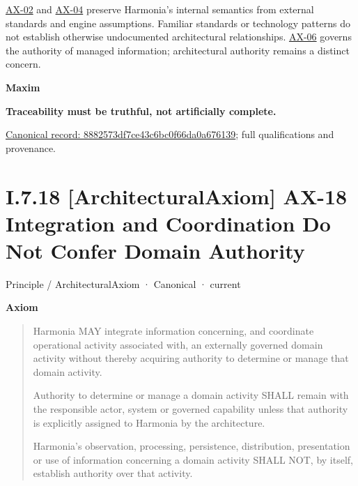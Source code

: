 \hyperref[element:eee8c3783d964d18a7f9dcea85fcd4cf]{AX-02}
and \hyperref[element:54508cda80484a6caf95b901780eaf7d]{AX-04}
preserve Harmonia's internal semantics from external standards and engine
assumptions. Familiar standards or technology patterns do not establish
otherwise undocumented architectural relationships.
\hyperref[element:952c3b6148ce4fce94b69f99a0c2fec7]{AX-06} governs the authority
of managed information; architectural authority remains a distinct concern.



\par\medskip\textbf{Maxim}\par


\textbf{Traceability must be truthful, not artificially complete.}


{\footnotesize \href{../../../../../../../continuum/motivation/principle/architectural-axiom/8882573df7ce43c6bc0f66da0a676139.md}{Canonical record: 8882573df7ce43c6bc0f66da0a676139}; full qualifications and provenance.}\par
\section*{I.7.18 [ArchitecturalAxiom] AX-18 Integration and Coordination Do Not Confer Domain Authority}
\label{navigation:I.7.18}

\label{element:b8cafe3cf5904d2bb9a9767260fddf78}
{\small Principle / ArchitecturalAxiom · Canonical · current}\par

\par\medskip\textbf{Axiom}\par


\begin{quote}


Harmonia MAY integrate information concerning, and coordinate operational activity associated with, an externally governed domain activity without thereby acquiring authority to determine or manage that domain activity.



Authority to determine or manage a domain activity SHALL remain with the responsible actor, system or governed capability unless that authority is explicitly assigned to Harmonia by the architecture.



Harmonia's observation, processing, persistence, distribution, presentation or use of information concerning a domain activity SHALL NOT, by itself, establish authority over that activity.



\end{quote}


